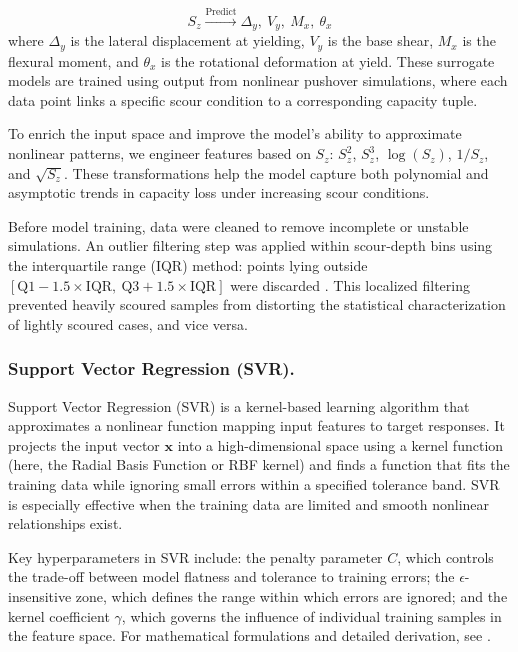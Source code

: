 \documentclass[authoryear,preprint,review,12pt]{elsarticle}
\begin{document}
\begin{equation}
S_z \xrightarrow{\text{Predict}} \Delta_y,\ V_y,\ M_x,\ \theta_x
\label{eq:sz_to_capacity}
\end{equation}
where $\Delta_y$ is the lateral displacement at yielding, $V_y$ is the base shear, $M_x$ is the flexural moment, and $\theta_x$ is the rotational deformation at yield. These surrogate models are trained using output from nonlinear pushover simulations, where each data point links a specific scour condition to a corresponding capacity tuple.

To enrich the input space and improve the model’s ability to approximate nonlinear patterns, we engineer features based on $S_z$: $S_z^2$, $S_z^3$, $\log(S_z)$, $1/S_z$, and $\sqrt{S_z}$. These transformations help the model capture both polynomial and asymptotic trends in capacity loss under increasing scour conditions.

Before model training, data were cleaned to remove incomplete or unstable simulations. An outlier filtering step was applied within scour-depth bins using the interquartile range (IQR) method: points lying outside $[\text{Q1} - 1.5 \times \text{IQR},\ \text{Q3} + 1.5 \times \text{IQR}]$ were discarded \citep{tukey1977exploratory}. This localized filtering prevented heavily scoured samples from distorting the statistical characterization of lightly scoured cases, and vice versa.



\subsubsection{Support Vector Regression (SVR).} 
Support Vector Regression (SVR) is a kernel-based learning algorithm that approximates a nonlinear function mapping input features to target responses. It projects the input vector $\bm{x}$ into a high-dimensional space using a kernel function (here, the Radial Basis Function or RBF kernel) and finds a function that fits the training data while ignoring small errors within a specified tolerance band. SVR is especially effective when the training data are limited and smooth nonlinear relationships exist.

Key hyperparameters in SVR include: the penalty parameter $C$, which controls the trade-off between model flatness and tolerance to training errors; the $\epsilon$-insensitive zone, which defines the range within which errors are ignored; and the kernel coefficient $\gamma$, which governs the influence of individual training samples in the feature space. For mathematical formulations and detailed derivation, see \citep{Smola2004SVR}.
\end{document}
